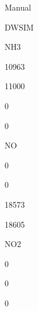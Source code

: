 \documentclass[a4paper,portrait,12pt]{article}
\begin{document}
\begin{flushleft}
Manual
\end{flushleft}





\begin{flushleft}
DWSIM
\end{flushleft}





\begin{flushleft}
NH3
\end{flushleft}





10963





11000





0





0





\begin{flushleft}
NO
\end{flushleft}





0





0





18573





18605





\begin{flushleft}
NO2
\end{flushleft}





0





0





0
\end{document}
